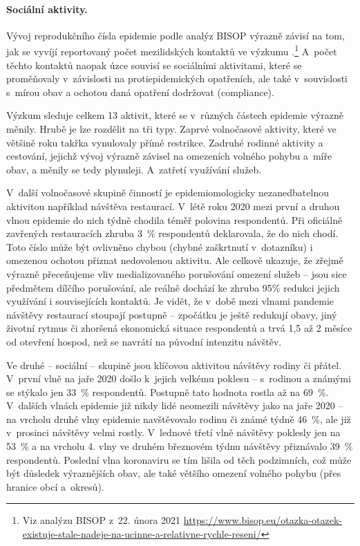 \label{Socialni_aktivity}

\paragraph{Sociální aktivity.} Vývoj reprodukčního čísla epidemie podle analýz BISOP vý\-raz\-ně závisí na tom, jak se vyvíjí reportovaný počet mezilidských kontaktů ve vý\-zku\-mu .\footnote{Viz analýzu BISOP z 22. února 2021
\url{https://www.bisop.eu/otazka-otazek-existuje-stale-nadeje-na-ucinne-a-relativne-rychle-reseni/}} A~počet těchto kontaktů naopak úzce souvisí se sociálními aktivitami, které se proměňovaly v závislosti na protiepidemických opatřeních, ale také v~souvislosti s~mírou obav a ochotou daná opatření dodržovat (compliance).

Výzkum  sleduje celkem 13 aktivit, které se v~různých částech epidemie výrazně měnily. Hrubě je lze rozdělit na tři typy. Zaprvé volnočasové aktivity, které ve většině roku takřka vynulovaly přímé restrikce. Zadruhé rodinné aktivity a cestování, jejichž vývoj výrazně závisel na omezeních volného pohybu a~míře obav, a měnily se tedy plynuleji. A~zatřetí využívání služeb.

V~další volnočasové skupině činností je epidemiomologicky nezanedbatelnou aktivitou například návštěva restaurací. V~létě roku 2020 mezi první a druhou vlnou epidemie do nich týdně chodila téměř polovina respondentů. Při oficiálně zavřených restauracích zhruba 3~\% respondentů deklarovala, že do nich chodí. Toto číslo může být ovlivněno chybou (chybné zaškrtnutí v~dotazníku) i omezenou ochotou přiznat nedovolenou aktivitu. Ale celkově ukazuje, že zřejmě výrazně přeceňujeme vliv medializovaného porušování omezení služeb – jsou sice předmětem dílčího porušování, ale reálně dochází ke zhruba 95\% redukci jejich využívání i souvisejících kontaktů. Je vidět, že v~době mezi vlnami pandemie návštěvy restaurací stoupají postupně – zpočátku je ještě redukují obavy, jiný životní rytmus či zhoršená ekonomická situace respondentů a trvá 1,5 až 2 měsíce od otevření hospod, než se navrátí na původní intenzitu návštěv.

Ve druhé – sociální – skupině jsou klíčovou aktivitou návštěvy rodiny či přátel. V~první vlně na jaře 2020 došlo k~jejich velkému poklesu – s~rodinou a známými se stýkalo jen 33~\% respondentů. Postupně tato hodnota rostla až na 69~\%. V dalších vlnách epidemie
již nikdy lidé neomezili návštěvy jako na jaře 2020 – na vrcholu druhé vlny epidemie navštěvovalo rodinu či známé týdně 46~\%, ale již v~prosinci návštěvy velmi rostly. V~lednové třetí vlně návštěvy poklesly jen na 53~\% a na vrcholu 4. vlny ve druhém březnovém týdnu návštěvy přiznávalo 39~\% respondentů. Poslední vlna koronaviru se tím lišila od těch podzimních, což může být důsledek výraznějších obav, ale také většího omezení volného pohybu (přes hranice obcí a~okresů).

